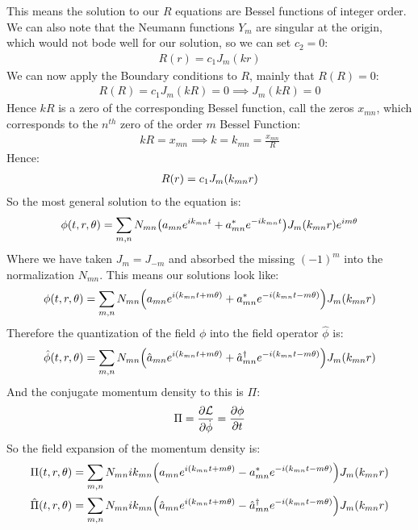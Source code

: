 \documentclass[12pt]{article}
\renewcommand{\L}{\mathcal{L}}
\begin{document}
This means the solution to our $R$ equations are Bessel functions of integer order. We can also note that the Neumann functions $Y_m$ are singular at the origin, which would not bode well for our solution, so we can set $c_2=0$:
\begin{align*}
  R(r)=c_1J_m(kr)
\end{align*}
We can now apply the Boundary conditions to $R$, mainly that $R(R)=0$:
\begin{align*}
  R(R)=c_1J_m(kR)=0\implies J_m(kR)=0
\end{align*}
Hence $kR$ is a zero of the corresponding Bessel function, call the zeros $x_{mn}$, which corresponds to the $n^{th}$ zero of the order $m$ Bessel Function:
\begin{align*}
  k R= x_{mn}\implies k=k_{mn}= \frac{x_{mn}}{R}
\end{align*}
Hence:
\begin{align*}
  R(r)=c_1J_m\qty(k_{mn}r)
\end{align*}
So the most general solution to the equation is:
\begin{align*}
  \phi(t,r,\theta)=\sum_{m,n}N_{mn}\qty(a_{mn}e^{ik_{mn}t}+a^*_{mn}e^{-ik_{mn}t})
  J_m(k_{mn}r)e^{im\theta}
\end{align*}
Where we have taken $J_{m}=J_{-m}$ and absorbed the missing $(-1)^m$ into the normalization $N_{mn}$. This means our solutions look like:
\begin{align*}
  \phi(t,r,\theta)=\sum_{m,n}N_{mn}
  \qty(a_{mn}e^{i(k_{mn}t+m\theta)}+a^*_{mn}e^{-i(k_{mn}t-m\theta)})J_m(k_{mn}r)
\end{align*}
Therefore the quantization of the field $\phi$ into the field operator $\hat\phi$ is:
\begin{align*}
  \hat\phi(t,r,\theta)=\sum_{m,n}N_{mn}\qty(
  \hat{a}_{mn}e^{i(k_{mn}t+m\theta)}+\hat{a}^\dag_{mn}e^{-i(k_{mn}t-m\theta)})
  J_m(k_{mn}r)
\end{align*}
And the conjugate momentum density to this is $\Pi$:
\begin{align*}
  \Pi=\pdv{\L}{\dot{\phi}}=\pdv{\phi}{t}
\end{align*}
So the field expansion of the momentum density is:
\begin{align*}
  \Pi(t,r,\theta)&=\sum_{m,n}N_{mn}ik_{mn}\qty(
  a_{mn}e^{i(k_{mn}t+m\theta)}-a^*_{mn}e^{-i(k_{mn}t-m\theta)})J_m(k_{mn}r)\\
  \hat\Pi(t,r,\theta)&=\sum_{m,n}N_{mn}ik_{mn}\qty(
  \hat{a}_{mn}e^{i(k_{mn}t+m\theta)}-\hat{a}^\dag_{mn}e^{-i(k_{mn}t-m\theta)})
  J_m(k_{mn}r)
\end{align*}
\end{document}
